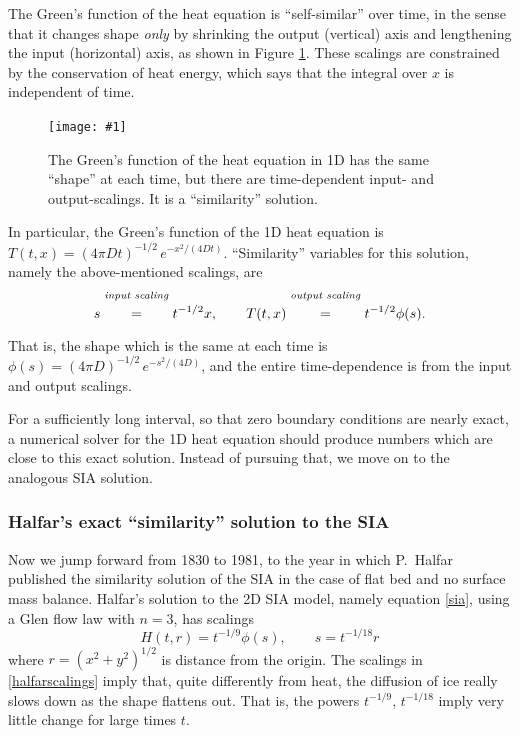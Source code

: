 \documentclass[titlepage,letterpaper,final,12pt]{scrartcl}
\newcommand{\onefigsize}[3]{
\begin{figure}[ht]
\centering
\texttt{[image: \#1]}
\caption{#2}
\label{fig:#1}
\end{figure}}
\begin{document}
The Green's function of the heat equation is ``self-similar'' over time, in the sense that it changes shape \emph{only} by shrinking the output (vertical) axis and lengthening the input (horizontal) axis, as shown in Figure \ref{fig:heatscaling}.  These scalings are constrained by the conservation of heat energy, which says that the integral over $x$ is independent of time.

\onefigsize{heatscaling}{The Green's function of the heat equation in 1D has the same ``shape'' at each time, but there are time-dependent input- and output-scalings.  It is a ``similarity'' solution.}{2.4in}

In particular, the Green's function of the 1D heat equation is $T(t,x) = (4 \pi D t)^{-1/2}\, e^{-x^2/(4Dt)}$.  ``Similarity'' variables for this solution, namely the above-mentioned scalings, are
	$$s \stackrel{\text{\emph{input scaling}}}{\phantom{\Big|}=\phantom{\Big|}} t^{-1/2} x, \qquad T(t,x) \stackrel{\text{\emph{output scaling}}}{\phantom{\Big|}=\phantom{\Big|}} t^{-1/2} \phi(s).$$
That is, the shape which is the same at each time is $\phi(s) = (4 \pi D)^{-1/2}\, e^{-s^2/(4D)}$, and the entire time-dependence is from the input and output scalings.

For a sufficiently long interval, so that zero boundary conditions are nearly exact, a numerical solver for the 1D heat equation should produce numbers which are close to this exact solution.  Instead of pursuing that, we move on to the analogous SIA solution.

\subsubsection*{Halfar's exact ``similarity'' solution to the SIA}  Now we jump forward from 1830 to 1981, to the year in which P.~Halfar published the similarity solution of the SIA in the case of flat bed and no surface mass balance.
Halfar's solution to the 2D SIA model, namely equation \eqref{sia}, using a Glen flow law with $n=3$, has scalings
\begin{equation}
H(t,r)=t^{-1/9} \phi(s), \qquad s = t^{-1/18} r \label{halfarscalings}
\end{equation}
where $r=(x^2+y^2)^{1/2}$ is distance from the origin.  The scalings in \eqref{halfarscalings} imply that, quite differently from heat, the diffusion of ice really slows down as the shape flattens out.  That is, the powers $t^{-1/9}$, $t^{-1/18}$ imply very little change for large times $t$.
\end{document}
